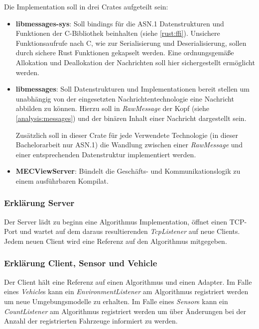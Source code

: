 Die Implementation soll in drei Crates aufgeteilt sein:
\begin{itemize}
	\item \textbf{libmessages-sys}: Soll bindings für die ASN.1 Datenstrukturen und Funktionen der C-Bibliothek beinhalten (siehe \autoref{rust:ffi}).
	Unsichere Funktionsaufrufe nach C, wie zur Serialisierung und Deserialisierung, sollen durch sichere Rust Funktionen gekapselt werden.
	Eine ordnungsgemäße Allokation und Deallokation der Nachrichten soll hier sichergestellt ermöglicht werden.
	
	\item \textbf{libmessages}: Soll Datenstrukturen und Implementationen bereit stellen um unabhängig von der eingesetzten Nachrichtentechnologie eine Nachricht abbilden zu können.
	Hierzu soll in \textit{RawMessage} der Kopf (siehe \autoref{analysis:messages}) und der binären Inhalt einer Nachricht dargestellt sein.
	
	Zusätzlich soll in dieser Crate für jede Verwendete Technologie (in dieser Bachelorarbeit nur ASN.1) die Wandlung zwischen einer \textit{RawMessage} und einer entsprechenden Datenstruktur implementiert werden.
	
	\item \textbf{MECViewServer}: Bündelt die Geschäfts- und Kommunikationslogik zu einem ausführbaren Kompilat.
\end{itemize}

\subsubsection{Erklärung Server}

Der Server lädt zu beginn eine Algorithmus Implementation, öffnet einen TCP-Port und wartet auf dem daraus resultierenden \textit{TcpListener} auf neue Clients.
Jedem neuen Client wird eine Referenz auf den Algorithmus mitgegeben.

\subsubsection{Erklärung Client, Sensor und Vehicle}

Der Client hält eine Referenz auf einen Algorithmus und einen Adapter.
Im Falle eines \textit{Vehicle}s kann ein \textit{EnvironmentListener} am Algorithmus registriert werden um neue Umgebungsmodelle zu erhalten.
Im Falle eines \textit{Sensor}s kann ein \textit{CountListener} am Algorithmus registriert werden um über Änderungen bei der Anzahl der registrierten Fahrzeuge informiert zu werden.

